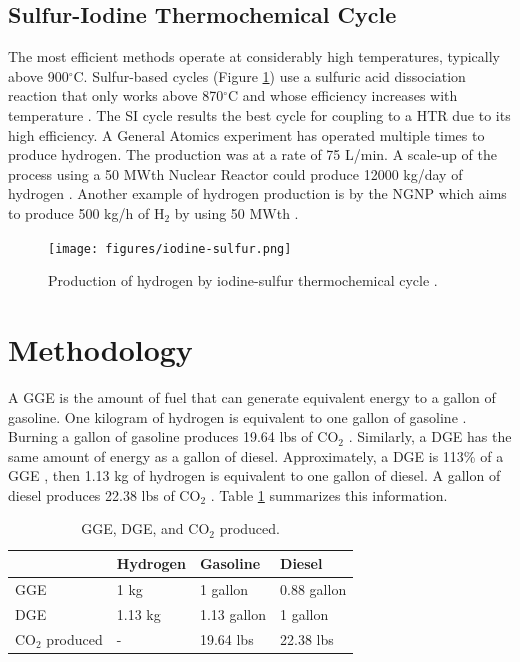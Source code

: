 \documentclass{anstrans}
\begin{document}
\subsection{Sulfur-Iodine Thermochemical Cycle}

The most efficient methods operate at considerably high temperatures, typically above 900$^{\circ}$C. Sulfur-based cycles (Figure \ref{fig:isulfur}) use a sulfuric acid dissociation reaction that only works above 870$^{\circ}$C and whose efficiency increases with temperature \cite{cea_gas-cooled_2006}.
The \gls{SI} cycle results the best cycle for coupling to a \gls{HTR} due to its high efficiency. A General Atomics experiment has operated multiple times to produce hydrogen.
The production was at a rate of 75 L/min. A scale-up of the process using a 50 MWth Nuclear Reactor could produce 12000 kg/day of hydrogen \cite{benjamin_russ_sulfur_2009}.
Another example of hydrogen production is by the \gls{NGNP} \cite{macdonald_ngnp_2003} which aims to produce 500 kg/h of H$_2$ by using 50 MWth \cite{cea_gas-cooled_2006}.

\begin{figure}[]
	\centering
	\texttt{[image: figures/iodine-sulfur.png]}
	\hfill
	\caption{Production of hydrogen by iodine-sulfur thermochemical cycle \cite{cea_gas-cooled_2006}.}
	\label{fig:isulfur}
\end{figure}

\section{Methodology}
\label{method}

A \gls{GGE} is the amount of fuel that can generate equivalent energy to a gallon of gasoline. One kilogram of hydrogen is equivalent to one gallon of gasoline \cite{doe_office_of_energy_efficiency_and_renewable_energy_hydrogen_2020}.
Burning a gallon of gasoline produces 19.64 lbs of CO$_2$ \cite{us_energy_information_administration_how_2014}.
Similarly, a \gls{DGE} has the same amount of energy as a gallon of diesel. Approximately, a \gls{DGE} is 113\% of a \gls{GGE} \cite{alternative_fuels_data_center_fuel_2014}, then 1.13 kg of hydrogen is equivalent to one gallon of diesel.
A gallon of diesel produces 22.38 lbs of CO$_2$ \cite{us_energy_information_administration_how_2014}.
Table \ref{tab:meth} summarizes this information.

\begin{table}[]
	\centering
    \caption{\gls{GGE}, \gls{DGE}, and CO$_2$ produced.}
    \label{tab:meth}
	\begin{tabular}{l|lll}
	\hline
	                 & Hydrogen & Gasoline    & Diesel      \\ \hline
	GGE              & 1 kg     & 1 gallon    & 0.88 gallon \\
	DGE              & 1.13 kg  & 1.13 gallon & 1 gallon    \\
    CO$_2$ produced  & -        & 19.64 lbs   & 22.38 lbs   \\ \hline

	\end{tabular}
\end{table}
\end{document}
